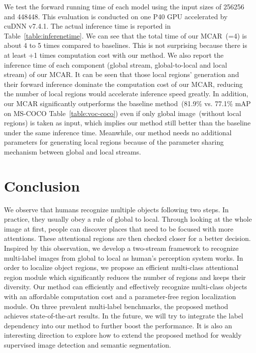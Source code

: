 \documentclass[journal]{IEEEtran}
\begin{document}
We test the forward running time of each model using the input sizes of 256256 and 448448. This evaluation is conducted on one P40 GPU accelerated by cuDNN v7.4.1. The actual inference time is reported  in Table~\ref{table:inferenetime}. We can see that the total time of our MCAR~(=4) is about 4 to 5 times compared to baselines. This is not surprising because there is at least +1 times computation cost with our method.  We also report the inference time of each component (global stream, global-to-local and local stream) of our MCAR. It can be seen that those local regions' generation and their forward inference dominate the computation cost of our MCAR, reducing the number of local regions would accelerate inference speed greatly. In addition, our MCAR significantly outperforms the baseline method~(81.9\% vs. 77.1\% mAP on MS-COCO Table~\ref{table:voc-coco}) even if only global image~(without local regions) is taken as input, which implies our method still better than the baseline under the same inference time. Meanwhile, our method needs no additional parameters for generating local regions because of the parameter sharing mechanism between global and local streams.

\section{Conclusion}\label{cons}
We observe that humans recognize multiple objects following two steps. In practice, they usually obey a rule of global to local. Through looking at the whole image at first, people can discover places that need to be focused with more attentions. These attentional regions are then checked closer for a better decision. Inspired by this observation, we develop a two-stream framework to recognize multi-label images from global to local as human's perception system works. In order to localize object regions, we propose an efficient multi-class attentional region module which significantly reduces the number of regions and keeps their diversity. Our method can efficiently and effectively recognize multi-class objects with an affordable computation cost and a parameter-free region localization module. On three prevalent multi-label benchmarks, the proposed method achieves state-of-the-art results. In the future, we will try to integrate the label dependency into our method to further boost the performance. It is also an interesting direction to explore how to extend the proposed method for weakly supervised image detection and semantic segmentation. 
\end{document}
